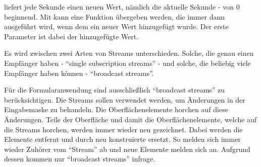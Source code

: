  liefert jede Sekunde einen neuen Wert, nämlich die aktuelle Sekunde - von 0 beginnend.
Mit  kann eine Funktion übergeben werden, die immer dann ausgeführt wird, wenn dem  ein neuer Wert hinzugefügt wurde. Der erste Parameter ist dabei der hinzugefügte Wert.



Es wird zwischen zwei Arten von Streams unterschieden.
Solche, die genau einen Empfänger haben - \enquote{single subscription streams} - und solche, die beliebig viele Empfänger haben können - \enquote{broadcast streams}.

Für die Formularanwendung sind ausschließlich \enquote{broadcast streams} zu berücksichtigen.
Die Streams sollen verwendet werden, um Änderungen in der Eingabemaske zu behandeln.
Die  Oberflächenelemente horchen auf diese Änderungen.
Teile der Oberfläche und damit die Oberflächenelemente, welche auf die Streams horchen, werden immer wieder neu gezeichnet.
Dabei werden die Elemente entfernt und durch neu konstruierte ersetzt.
So melden sich immer wieder Zuhörer vom \enquote{Stream} ab und neue Elemente melden sich an.
Aufgrund dessen kommen nur \enquote{broadcast streams} infrage.


